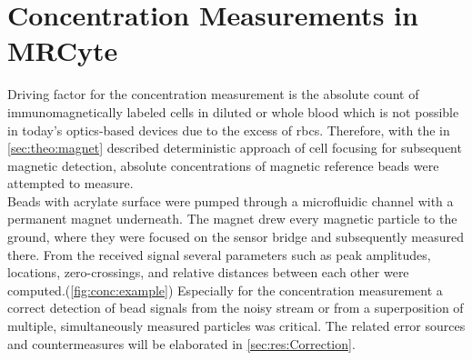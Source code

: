 \section{Concentration Measurements in MRCyte}
\label{sec:res:ConcMeas}
Driving factor for the concentration measurement is the absolute count of immunomagnetically labeled cells in diluted or whole blood which is not possible in today's optics-based devices due to the excess of \glspl{rbc}.\cite{lit:bio:Alberts} Therefore, with the in \cref{sec:theo:magnet} described deterministic approach of cell focusing for subsequent magnetic detection, absolute concentrations of magnetic reference beads were attempted to measure.\\
Beads with acrylate surface were pumped through a microfluidic channel with a permanent magnet underneath. The magnet drew every magnetic particle to the ground, where they were focused on the sensor bridge and subsequently measured there. From the received signal several parameters such as peak amplitudes, locations, zero-crossings, and relative distances between each other were computed.(\cref{fig:conc:example}) Especially for the concentration measurement a correct detection of bead signals from the noisy stream or from a superposition of multiple, simultaneously measured particles was critical. The related error sources and countermeasures will be elaborated in \cref{sec:res:Correction}.


